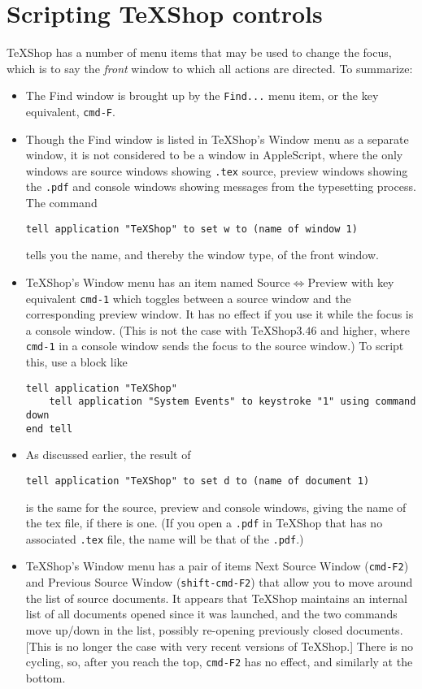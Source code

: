 \documentclass[11pt]{amsart}
\def\TeXShop{\TeX Shop\xspace}
\begin{document}
\section{Scripting TeXShop controls}
\TeX Shop has a number of menu items that may be used to change the focus, which is to say the \emph{front} window to which all actions are directed. To summarize:
\begin{itemize}
\item
The \textsf{Find} window is brought up by the {\tt Find...} menu item, or the key equivalent, {\tt cmd-F}.
\item Though the \textsf{Find} window is listed in \TeX Shop's Window menu as a separate window, it is not considered to be a window in AppleScript, where the only windows are source windows showing {\tt.tex} source, preview windows showing the {\tt.pdf} and console windows showing messages from the typesetting process. The command
\begin{verbatim}
tell application "TeXShop" to set w to (name of window 1)
\end{verbatim}
tells you the name, and thereby the window type, of the front window.
\item \TeX Shop's Window menu has an item named \textsf{Source}$\Leftrightarrow$\textsf{Preview} with key equivalent {\tt cmd-1} which toggles between a source window and the corresponding preview window. It has no effect if you use it while the focus is a console window. (This is not the case with \TeXShop $3.46$ and higher, where {\tt cmd-1} in a console window sends the focus to the source window.) To script this, use a block like
\begin{verbatim}
tell application "TeXShop"
    tell application "System Events" to keystroke "1" using command down
end tell
\end{verbatim}
\item As discussed earlier, the result of
\begin{verbatim}
tell application "TeXShop" to set d to (name of document 1)
\end{verbatim}
is the same for the source, preview and console windows, giving the name of the tex file, if there is one. (If you open a {\tt.pdf} in \TeX Shop that has no associated {\tt.tex} file, the name will be that of the {\tt.pdf}.)
\item \TeX Shop's \textsf{Window} menu has a pair of items \textsf{Next Source Window} ({\tt cmd-F2}) and \textsf{Previous Source Window} ({\tt shift-cmd-F2}) that allow you to  move around the list of source documents. It appears that \TeX Shop maintains an internal list of all documents opened since it was launched, and the two commands move up/down in the list, possibly re-opening previously closed documents. [This is no longer the case with very recent versions of \TeXShop.] There is no cycling, so, after you reach the top, {\tt cmd-F2} has no effect, and similarly at the bottom.


\end{itemize}
\end{document}
